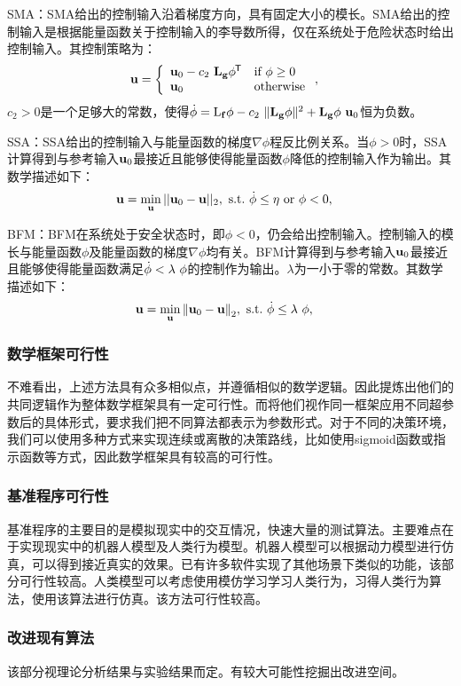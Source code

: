 SMA：SMA给出的控制输入沿着梯度方向，具有固定大小的模长。SMA给出的控制输入是根据能量函数关于控制输入的李导数所得，仅在系统处于危险状态时给出控制输入。其控制策略为：
\begin{align}
    & \mathbf{u} = \left\{\begin{array}{ll}\mathbf{u}_0 - c_2\ \mathbf{L}_{\mathbf{g}}\phi ^{\mkern-1.5mu\mathsf{T}} &   \text{if } \phi \geq 0 \\
    \mathbf{u}_0 & \mathrm{otherwise}
    \end{array}\right. \label{eq: smc},
\end{align}
$c_2>0$是一个足够大的常数，使得$\dot{\phi} = \mathrm{L}_{\mathbf{f}}\phi - c_2\ \|\mathbf{L}_{\mathbf{g}}\phi\|^2 + \mathbf{L}_{\mathbf{g}}\phi\ \mathbf{u}_0$恒为负数。


SSA：SSA给出的控制输入与能量函数的梯度$\nabla \phi$程反比例关系。当$\phi>0$时，SSA计算得到与参考输入$\mathbf{u}_0$最接近且能够使得能量函数$\phi$降低的控制输入作为输出。其数学描述如下：
\begin{align}\label{eq: SSA}
    & \mathbf{u} = \min_{\mathbf{u}} ||\mathbf{u}_0 - \mathbf{u}||_2,\ \mathrm{s.t.} \ \dot \phi\leq \eta \ \text{or}\ \phi < 0,
\end{align}

BFM：BFM在系统处于安全状态时，即$\phi < 0$，仍会给出控制输入。控制输入的模长与能量函数$\phi$及能量函数的梯度$\nabla \phi$均有关。BFM计算得到与参考输入$\mathbf{u}_0$最接近且能够使得能量函数满足$\dot{\mathbf{\phi}} < \lambda\ \mathbf{\phi}$的控制作为输出。$\lambda$为一小于零的常数。其数学描述如下：
\begin{align}\label{eq: BFM}
    & \mathbf{u} = \min_{\mathbf{u}} \norm{\mathbf{u}_0 - \mathbf{u}}_2,\ \mathrm{s.t.}\ \dot{\mathbf{\phi}} \leq \lambda\ \mathbf{\phi},
\end{align}

\subsubsection{数学框架可行性}

不难看出，上述方法具有众多相似点，并遵循相似的数学逻辑。因此提炼出他们的共同逻辑作为整体数学框架具有一定可行性。而将他们视作同一框架应用不同超参数后的具体形式，要求我们把不同算法都表示为参数形式。对于不同的决策环境，我们可以使用多种方式来实现连续或离散的决策路线，比如使用sigmoid函数或指示函数等方式，因此数学框架具有较高的可行性。

\subsubsection{基准程序可行性}

基准程序的主要目的是模拟现实中的交互情况，快速大量的测试算法。主要难点在于实现现实中的机器人模型及人类行为模型。机器人模型可以根据动力模型进行仿真，可以得到接近真实的效果。已有许多软件实现了其他场景下类似的功能，该部分可行性较高。人类模型可以考虑使用模仿学习学习人类行为，习得人类行为算法，使用该算法进行仿真。该方法可行性较高。

\subsubsection{改进现有算法}

该部分视理论分析结果与实验结果而定。有较大可能性挖掘出改进空间。
